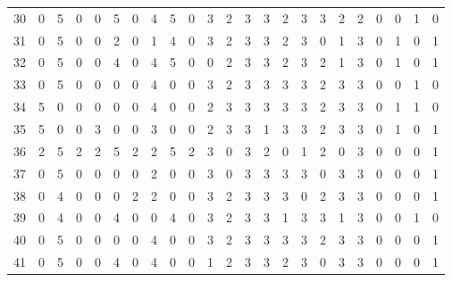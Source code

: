 \begin{table}[htbp]
{\begin{tabular}{lllllllllllllllllllllll}
30                  & 0 & 5 & 0 & 0 & 5 & 0 & 4 & 5 & 0 & 3 & 2 & 3 & 3 & 2 & 3 & 3 & 2 & 2 & 0                  & 0                   & 1                   & 0                   \\
31                  & 0 & 5 & 0 & 0 & 2 & 0 & 1 & 4 & 0 & 3 & 2 & 3 & 3 & 2 & 3 & 0 & 1 & 3 & 0                  & 1                   & 0                   & 1                   \\
32                  & 0 & 5 & 0 & 0 & 4 & 0 & 4 & 5 & 0 & 0 & 2 & 3 & 3 & 2 & 3 & 2 & 1 & 3 & 0                  & 1                   & 0                   & 1                   \\
33                  & 0 & 5 & 0 & 0 & 0 & 0 & 4 & 0 & 0 & 3 & 2 & 3 & 3 & 3 & 3 & 2 & 3 & 3 & 0                  & 0                   & 1                   & 0                   \\
34                  & 5 & 0 & 0 & 0 & 0 & 0 & 4 & 0 & 0 & 2 & 3 & 3 & 3 & 3 & 3 & 2 & 3 & 3 & 0                  & 1                   & 1                   & 0                   \\
35                  & 5 & 0 & 0 & 3 & 0 & 0 & 3 & 0 & 0 & 2 & 3 & 3 & 1 & 3 & 3 & 2 & 3 & 3 & 0                  & 1                   & 0                   & 1                   \\
36                  & 2 & 5 & 2 & 2 & 5 & 2 & 2 & 5 & 2 & 3 & 0 & 3 & 2 & 0 & 1 & 2 & 0 & 3 & 0                  & 0                   & 0                   & 1                   \\
37                  & 0 & 5 & 0 & 0 & 0 & 0 & 2 & 0 & 0 & 3 & 0 & 3 & 3 & 3 & 3 & 0 & 3 & 3 & 0                  & 0                   & 0                   & 1                   \\
38                  & 0 & 4 & 0 & 0 & 0 & 2 & 2 & 0 & 0 & 3 & 2 & 3 & 3 & 3 & 0 & 2 & 3 & 3 & 0                  & 0                   & 0                   & 1                   \\
39                  & 0 & 4 & 0 & 0 & 4 & 0 & 0 & 4 & 0 & 3 & 2 & 3 & 3 & 1 & 3 & 3 & 1 & 3 & 0                  & 0                   & 1                   & 0                   \\
40                  & 0 & 5 & 0 & 0 & 0 & 0 & 4 & 0 & 0 & 3 & 2 & 3 & 3 & 3 & 3 & 2 & 3 & 3 & 0                  & 0                   & 0                   & 1                   \\
41                  & 0 & 5 & 0 & 0 & 4 & 0 & 4 & 0 & 0 & 1 & 2 & 3 & 3 & 2 & 3 & 0 & 3 & 3 & 0                  & 0                   & 0                   & 1                   \\

\end{tabular}}
\end{table}

